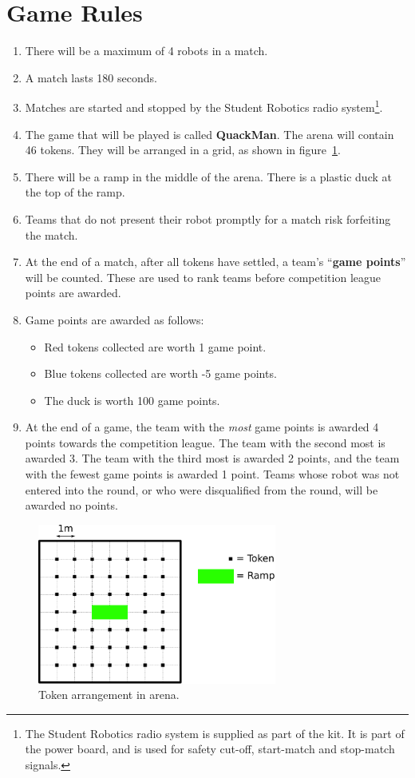 \section {Game Rules}
\label{game-rules}

\begin{enumerate}
\item There will be a maximum of 4 robots in a match.
\item A match lasts 180 seconds.
\item Matches are started and stopped by the Student Robotics radio system\footnote{The Student Robotics radio system is supplied as part of the kit.
 It is part of the power board, and is used for safety cut-off, start-match and stop-match signals.}.
\item The game that will be played is called \textbf{QuackMan}.  The arena will contain 46 tokens.  They will be arranged in a grid, as shown in figure~\ref{fig:token-arrangement}.
\item There will be a ramp in the middle of the arena.  There is a plastic duck at the top of the ramp.
\item Teams that do not present their robot promptly for a match risk forfeiting the match.

\item At the end of a match, after all tokens have settled, a team's ``\textbf{game points}'' will be counted.
 These are used to rank teams before competition league points are awarded.

\item Game points are awarded as follows:
\begin{itemize}
\item Red tokens collected are worth 1 game point.
\item Blue tokens collected are worth -5 game points.
\item The duck is worth 100 game points.
\end{itemize}

\item At the end of a game, the team with the \emph{most} game points is awarded 4 points towards the competition league.
 The team with the second most is awarded 3.
 The team with the third most is awarded 2 points, and the team with the fewest game points is awarded 1 point.
 Teams whose robot was not entered into the round, or who were disqualified from the round, will be awarded no points.
\end{enumerate}

\begin{figure}
  \begin{center}
    \includegraphics[keepaspectratio,width=0.7\textwidth]{./images/token-layout.pdf}
  \end{center}
  \caption{\label{fig:token-arrangement}Token arrangement in arena.}
\end{figure}
